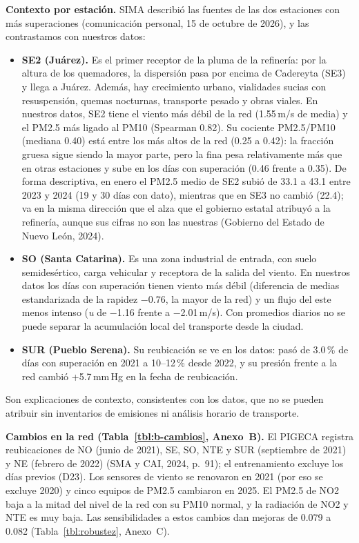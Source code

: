 \textbf{Contexto por estación.} SIMA describió las fuentes de las dos estaciones con más superaciones (comunicación personal, 15 de octubre de 2026), y las contrastamos con nuestros datos:
\begin{itemize}
\item \textbf{SE2 (Juárez).} Es el primer receptor de la pluma de la refinería: por la altura de los quemadores, la dispersión pasa por encima de Cadereyta (SE3) y llega a Juárez. Además, hay crecimiento urbano, vialidades sucias con resuspensión, quemas nocturnas, transporte pesado y obras viales. En nuestros datos, SE2 tiene el viento más débil de la red (1.55\,m/s de media) y el PM2.5 más ligado al PM10 (Spearman 0.82). Su cociente PM2.5/PM10 (mediana 0.40) está entre los más altos de la red (0.25 a 0.42): la fracción gruesa sigue siendo la mayor parte, pero la fina pesa relativamente más que en otras estaciones y sube en los días con superación (0.46 frente a 0.35). De forma descriptiva, en enero el PM2.5 medio de SE2 subió de 33.1 a 43.1\ugm{} entre 2023 y 2024 (19 y 30 días con dato), mientras que en SE3 no cambió (22.4\ugm); va en la misma dirección que el alza que el gobierno estatal atribuyó a la refinería, aunque sus cifras no son las nuestras (Gobierno del Estado de Nuevo León, 2024).
\item \textbf{SO (Santa Catarina).} Es una zona industrial de entrada, con suelo semidesértico, carga vehicular y receptora de la salida del viento. En nuestros datos los días con superación tienen viento más débil (diferencia de medias estandarizada de la rapidez −0.76, la mayor de la red) y un flujo del este menos intenso (\emph{u} de −1.16 frente a −2.01\,m/s). Con promedios diarios no se puede separar la acumulación local del transporte desde la ciudad.
\item \textbf{SUR (Pueblo Serena).} Su reubicación se ve en los datos: pasó de 3.0\,\% de días con superación en 2021 a 10–12\,\% desde 2022, y su presión frente a la red cambió +5.7\,mm\,Hg en la fecha de reubicación.
\end{itemize}
Son explicaciones de contexto, consistentes con los datos, que no se pueden atribuir sin inventarios de emisiones ni análisis horario de transporte.

\textbf{Cambios en la red (Tabla~\ref{tbl:b-cambios}, Anexo~B).} El PIGECA registra reubicaciones de NO (junio de 2021), SE, SO, NTE y SUR (septiembre de 2021) y NE (febrero de 2022) (SMA y CAI, 2024, p.~91); el entrenamiento excluye los días previos (D23). Los sensores de viento se renovaron en 2021 (por eso se excluye 2020) y cinco equipos de PM2.5 cambiaron en 2025. El PM2.5 de NO2 baja a la mitad del nivel de la red con su PM10 normal, y la radiación de NO2 y NTE es muy baja. Las sensibilidades a estos cambios dan mejoras de 0.079 a 0.082 (Tabla~\ref{tbl:robustez}, Anexo~C).

